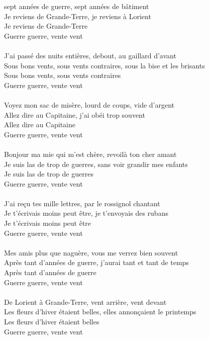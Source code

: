 
 sept années de guerre, sept années de bâtiment \bissimple
\\Je reviens de Grande-Terre, je reviens à Lorient
\\Je reviens de Grande-Terre
\\Guerre guerre, vente vent
\\\\J'ai passé des nuits entières, debout, au gaillard d'avant \bissimple
\\Sous bons vents, sous vents contraires, sous la bise et les brisants
\\Sous bons vents, sous vents contraires
\\Guerre guerre, vente vent
\\\\Voyez mon sac de misère, lourd de coups, vide d'argent \bissimple
\\Allez dire au Capitaine, j'ai obéi trop souvent
\\Allez dire au Capitaine
\\Guerre guerre, vente vent
\\\\Bonjour ma mie qui m'est chère, revoilà ton cher amant \bissimple
\\Je suis las de trop de guerres, sans voir grandir mes enfants
\\Je suis las de trop de guerres
\\Guerre guerre, vente vent
\\\\J'ai reçu tes mille lettres, par le rossignol chantant \bissimple
\\Je t'écrivais moins peut être, je t'envoyais des rubans
\\Je t'écrivais moins peut être
\\Guerre guerre, vente vent
\\\\Mes amis plus que naguère, vous me verrez bien souvent \bissimple
\\Après tant d'années de guerre, j'aurai tant et tant de temps
\\Après tant d'années de guerre
\\Guerre guerre, vente vent
\\\\De Lorient à Grande-Terre, vent arrière, vent devant \bissimple
\\Les fleurs d'hiver étaient belles, elles annonçaient le printemps
\\Les fleurs d'hiver étaient belles
\\Guerre guerre, vente vent
\breakpage